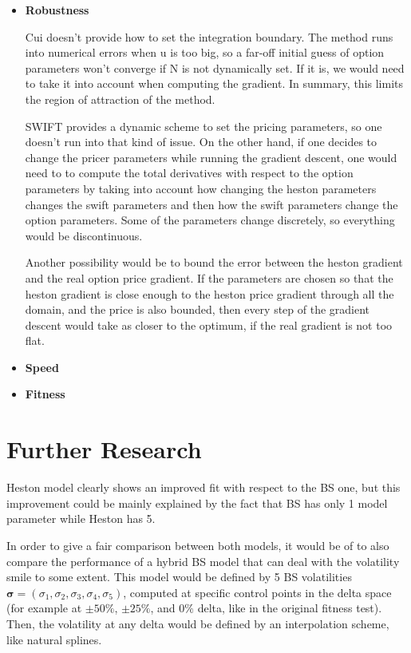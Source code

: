 \documentclass[12,twoside]{mammeTFM}
\theoremstyle{definition}
\theoremstyle{remark}
\begin{document}
\begin{itemize}

\item \textbf{Robustness}

Cui doesn't provide how to set the integration boundary. The method runs into numerical errors when u is too big, so a far-off initial guess of option parameters won't converge if N is not dynamically set. If it is, we would need to take it into account when computing the gradient. In summary, this limits the region of attraction of the method.

SWIFT provides a dynamic scheme to set the pricing parameters, so one doesn't run into that kind of issue. On the other hand, if one decides to change the pricer parameters while running the gradient descent, one would need to to compute the total derivatives with respect to the option parameters by taking into account how changing the heston parameters changes the swift parameters and then how the swift parameters change the option parameters. Some of the parameters change discretely, so everything would be discontinuous.

Another possibility would be to bound the error between the heston gradient and the real option price gradient. If the parameters are chosen so that the heston gradient is close enough to the heston price gradient through all the domain, and the price is also bounded, then every step of the gradient descent would take as closer to the optimum, if the real gradient is not too flat.

\item \textbf{Speed}

\item \textbf{Fitness}

\end{itemize}

\section{Further Research}
Heston model clearly shows an improved fit with respect to the BS one, but this improvement could be mainly explained by the fact that BS has only 1 model parameter while Heston has 5.

In order to give a fair comparison between both models, it would be of to also compare the performance of a hybrid BS model that can deal with the volatility smile to some extent. This model would be defined by 5 BS volatilities $\boldsymbol{\sigma} = (\sigma_1, \sigma_2, \sigma_3, \sigma_4, \sigma_5)$, computed at specific control points in the delta space (for example at $\pm50\%$, $\pm25\%$, and $0\%$ delta, like in the original fitness test). Then, the volatility at any delta would be defined by an interpolation scheme, like natural splines.
\end{document}
